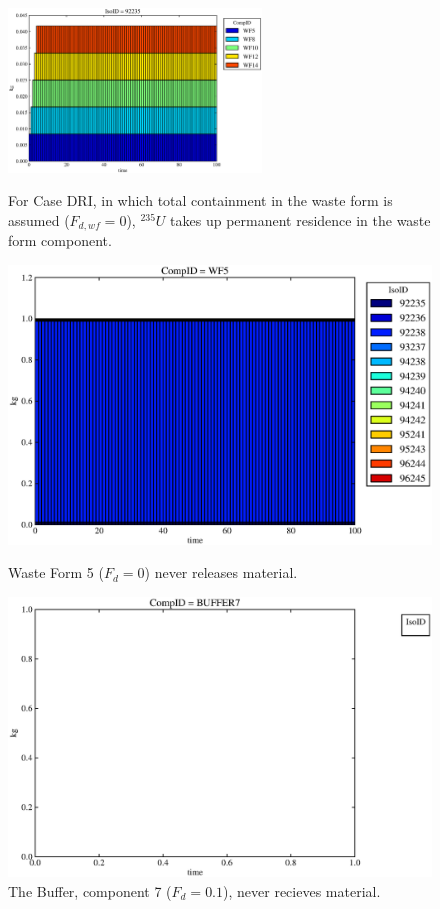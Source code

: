 
\begin{figure}[ht]
\centering
\includegraphics[width=0.6\textwidth]{./chapters/demonstration/base/drI.eps}
\caption[$^{235}U$ residence. Degradation Rate Waste Form No Release.]{
For Case DRI, in which total containment in the waste form is assumed ($F_{d,wf}=0$), 
$^{235}U$ takes up permanent residence in the waste form component.
}
\label{fig:drIall}
\begin{minipage}[b]{0.45\linewidth}

  \includegraphics[width=\textwidth]{./chapters/demonstration/base/drI1.eps}
  \caption[Case DRI Waste Form Contaminants.]{
    Waste Form 5 ($F_d = 0$) never releases material.
    }
  \label{fig:drIwf5}
  
  \includegraphics[width=\textwidth]{./chapters/demonstration/base/drI3.eps}
  \caption[Case DRI Buffer Contaminants]{
    The Buffer, component 7 ($F_d = 0.1$), never recieves material.
    }
  \label{fig:drIbuff}


\end{minipage}
\end{figure}
